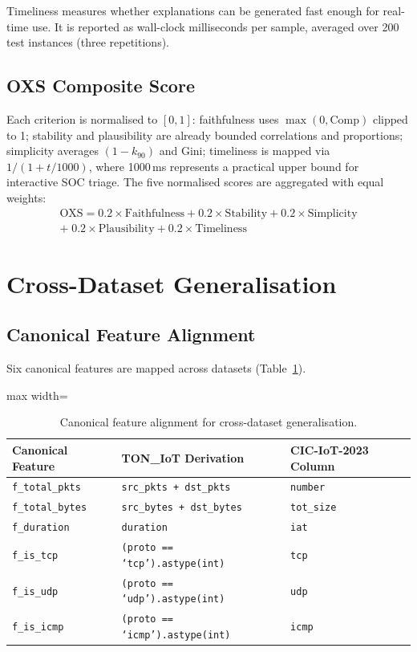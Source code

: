 \documentclass[12pt,a4paper]{report}
\begin{document}
Timeliness measures whether explanations can be generated fast enough for real-time use. It is reported as wall-clock milliseconds per sample, averaged over 200 test instances (three repetitions).

\subsection{OXS Composite Score}
\label{sec:oxs}

Each criterion is normalised to $[0, 1]$: faithfulness uses $\max(0, \text{Comp})$ clipped to 1; stability and plausibility are already bounded correlations and proportions; simplicity averages $(1 - k_{90})$ and Gini; timeliness is mapped via $1 / (1 + t / 1000)$, where 1000\,ms represents a practical upper bound for interactive SOC triage. The five normalised scores are aggregated with equal weights:
\begin{multline}
\text{OXS} = 0.2 \times \text{Faithfulness} + 0.2 \times \text{Stability} + 0.2 \times \text{Simplicity} \\
 + \; 0.2 \times \text{Plausibility} + 0.2 \times \text{Timeliness}
\end{multline}

\section{Cross-Dataset Generalisation}
\label{sec:cross-dataset}

\subsection{Canonical Feature Alignment}
\label{sec:alignment}

Six canonical features are mapped across datasets (Table~\ref{tab:canonical}).

\begin{table}[H]
\centering
\caption{Canonical feature alignment for cross-dataset generalisation.}
\label{tab:canonical}
\begin{adjustbox}{max width=\textwidth}
\begin{tabular}{lll}
\toprule
\textbf{Canonical Feature} & \textbf{TON\_IoT Derivation} & \textbf{CIC-IoT-2023 Column} \\
\midrule
\texttt{f\_total\_pkts} & \texttt{src\_pkts + dst\_pkts} & \texttt{number} \\
\texttt{f\_total\_bytes} & \texttt{src\_bytes + dst\_bytes} & \texttt{tot\_size} \\
\texttt{f\_duration} & \texttt{duration} & \texttt{iat} \\
\texttt{f\_is\_tcp} & \texttt{(proto == `tcp').astype(int)} & \texttt{tcp} \\
\texttt{f\_is\_udp} & \texttt{(proto == `udp').astype(int)} & \texttt{udp} \\
\texttt{f\_is\_icmp} & \texttt{(proto == `icmp').astype(int)} & \texttt{icmp} \\
\bottomrule
\end{tabular}
\end{adjustbox}
\end{table}
\end{document}
